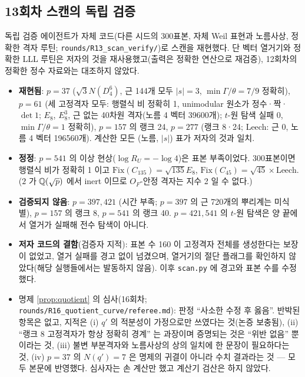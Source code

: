 \subsection{13회차 스캔의 독립 검증}\label{sec:r13verify}
독립 검증 에이전트가 자체 코드(다른 시드의 300표본, 자체 Weil 표현과 노름사상, 정확한 격자 루틴; \texttt{rounds/R13\_scan\_verify/})로 스캔을 재현했다. 단 벡터 열거기와 정확한 LLL 루틴은 저자의 것을 재사용했고(출력은 정확한 연산으로 재검증), 12회차의 정확한 정수 자료와는 대조하지 않았다.
\begin{itemize}
\item \textbf{재현됨}: $p=37$ ($\sqrt3N(D_4^6)$, 근 144개 모두 $|s|=3$, $\min\Gamma/\theta=7/9$ 정확히), $p=61$ (세 고정격자 모두: 행렬식 비 정확히 1, unimodular 원소가 정수·짝·$\det1$; $E_8$, $E_8^3$, 근 없는 40차원 격자(노름 4 벡터 39600개); $t$-원 탐색 실패 0, $\min\Gamma/\theta=1$ 정확히), $p=157$ 의 랭크 24, $p=277$ (랭크 8·24; Leech: 근 0, 노름 4 벡터 196560개). 계산한 모든 (노름, $|s|$) 표가 저자의 것과 일치.
\item \textbf{정정}: $p=541$ 의 이상 현상($\log R_U=-\log4$)은 표본 부족이었다. 300표본이면 행렬식 비가 정확히 1 이고 $\mathrm{Fix}(C_{135})=\sqrt{135}E_8$, $\mathrm{Fix}(C_{45})=\sqrt{45}\times$Leech. ($2$ 가 $\mathbb{Q}(\sqrt p)$ 에서 inert 이므로 $O_F$-안정 격자는 지수 2 일 수 없다.)
\item \textbf{검증되지 않음}: $p=397,421$ (시간 부족; $p=397$ 의 근 720개의 뿌리계는 미식별), $p=157$ 의 랭크 8, $p=541$ 의 랭크 40. $p=421,541$ 의 $t$-원 탐색은 양 끝에서 열거가 실패해 전수 탐색이 아니다.
\item \textbf{저자 코드의 결함}(검증자 지적): 표본 수 160 이 고정격자 전체를 생성한다는 보장이 없었고, 열거 실패를 경고 없이 넘겼으며, 열거기의 절단 플래그를 확인하지 않았다(해당 실행들에서는 발동하지 않음). 이후 \texttt{scan.py} 에 경고와 표본 수를 수정했다.
\item 명제 \ref{prop:quotient} 의 심사(16회차; \texttt{rounds/R16\_quotient\_curve/referee.md}): 판정 ``사소한 수정 후 옳음''. 반박된 항목은 없고, 지적은 (i) $q'$ 의 적분성이 가정으로만 쓰였다는 것(논증 보충됨), (ii) ``랭크 8 고정격자가 항상 정확히 경계'' 는 과장이며 증명되는 것은 ``위반 없음'' 뿐이라는 것, (iii) 불변 부분격자와 노름사상의 상의 일치에 한 문장이 필요하다는 것, (iv) $p=37$ 의 $N(q')=7$ 은 명제의 귀결이 아니라 수치 결과라는 것 --- 모두 본문에 반영했다. 심사자는 손 계산만 했고 계산기 검산은 하지 않았다.
\end{itemize}
